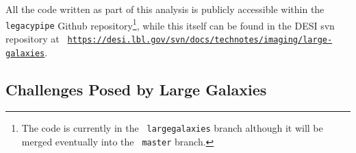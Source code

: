 
All the code written as part of this analysis is publicly accessible within the
{\tt legacypipe} Github repository\footnote{The code is currently in the {\tt
    largegalaxies} branch although it will be merged eventually into the {\tt
    master} branch.}, while this \tnote{} itself can be found in the DESI {\sc
  svn} repository at {\tt
  \url{https://desi.lbl.gov/svn/docs/technotes/imaging/large-galaxies}}.

\subsection{Challenges Posed by Large Galaxies}\label{sec:challenges}

